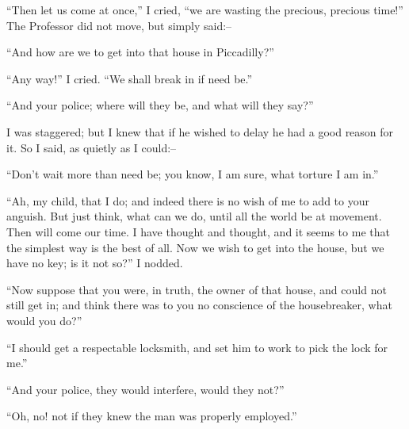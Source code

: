 \documentclass[12pt,openright]{book}
\begin{document}
“Then let us come at once,” I cried, “we are wasting the precious, precious time!” The Professor did not move, but simply said:–

“And how are we to get into that house in Piccadilly?”

“Any way!” I cried. “We shall break in if need be.”

“And your police; where will they be, and what will they say?”

I was staggered; but I knew that if he wished to delay he had a good reason for it. So I said, as quietly as I could:–

“Don’t wait more than need be; you know, I am sure, what torture I am in.”

“Ah, my child, that I do; and indeed there is no wish of me to add to your anguish. But just think, what can we do, until all the world be at movement. Then will come our time. I have thought and thought, and it seems to me that the simplest way is the best of all. Now we wish to get into the house, but we have no key; is it not so?” I nodded.

“Now suppose that you were, in truth, the owner of that house, and could not still get in; and think there was to you no conscience of the housebreaker, what would you do?”

“I should get a respectable locksmith, and set him to work to pick the lock for me.”

“And your police, they would interfere, would they not?”

“Oh, no! not if they knew the man was properly employed.”
\end{document}
